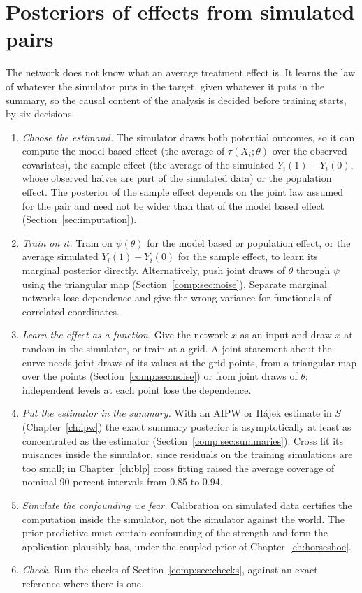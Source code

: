 \section{Posteriors of effects from simulated pairs}\label{gbc:sec:efficiency}\label{comp:sec:core}

The network does not know what an average treatment effect is. It learns the law of whatever the simulator puts in the target, given whatever it puts in the summary, so the causal content of the analysis is decided before training starts, by six decisions.

\begin{enumerate}[leftmargin=*]
\item \emph{Choose the estimand.} The simulator draws both potential outcomes, so it can compute the model based effect (the average of $\tau(X_i;\theta)$ over the observed covariates), the sample effect (the average of the simulated $Y_i(1)-Y_i(0)$, whose observed halves are part of the simulated data) or the population effect. The posterior of the sample effect depends on the joint law assumed for the pair and need not be wider than that of the model based effect (Section~\ref{sec:imputation}).
\item \emph{Train on it.} Train on $\psi(\theta)$ for the model based or population effect, or the average simulated $Y_i(1)-Y_i(0)$ for the sample effect, to learn its marginal posterior directly. Alternatively, push joint draws of $\theta$ through $\psi$ using the triangular map (Section~\ref{comp:sec:noise}). Separate marginal networks lose dependence and give the wrong variance for functionals of correlated coordinates.
\item \emph{Learn the effect as a function.} Give the network $x$ as an input and draw $x$ at random in the simulator, or train at a grid. A joint statement about the curve needs joint draws of its values at the grid points, from a triangular map over the points (Section~\ref{comp:sec:noise}) or from joint draws of $\theta$; independent levels at each point lose the dependence.
\item \emph{Put the estimator in the summary.} With an AIPW or H\'ajek estimate in $S$ (Chapter~\ref{ch:ipw}) the exact summary posterior is asymptotically at least as concentrated as the estimator (Section~\ref{comp:sec:summaries}). Cross fit its nuisances inside the simulator, since residuals on the training simulations are too small; in Chapter~\ref{ch:blp} cross fitting raised the average coverage of nominal 90 percent intervals from 0.85 to 0.94.
\item \emph{Simulate the confounding we fear.} Calibration on simulated data certifies the computation inside the simulator, not the simulator against the world. The prior predictive must contain confounding of the strength and form the application plausibly has, under the coupled prior of Chapter~\ref{ch:horseshoe}.
\item \emph{Check.} Run the checks of Section~\ref{comp:sec:checks}, against an exact reference where there is one.
\end{enumerate}

